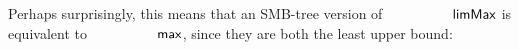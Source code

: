   Perhaps surprisingly, this means that an SMB-tree version of $\limMax$
  is equivalent to $\AgdaFunction{max}$, since they are both the least upper bound:
  \begin{code}%
\>[0]\<%
\\
\>[0]\AgdaSpace{}%
\AgdaSymbol{:}\AgdaSpace{}%
\AgdaSymbol{(}\AgdaSpace{}%
\AgdaSpace{}%
\AgdaSymbol{)}\AgdaSpace{}%
\AgdaSpace{}%
\<%
\\
\>[0]\AgdaSpace{}%
\AgdaSpace{}%
\AgdaSymbol{=}\AgdaSpace{}%
\AgdaSpace{}%
%
\>[17]\AgdaSpace{}%
\AgdaSpace{}%
\AgdaSpace{}%
\AgdaSpace{}%
\AgdaSymbol{(}\AgdaSpace{}%
\AgdaSpace{}%
\AgdaSymbol{))}\<%
\\
%
\\[\AgdaEmptyExtraSkip]%
\>[0]\AgdaSpace{}%
\AgdaSymbol{:}\AgdaSpace{}%
\AgdaSpace{}%
\AgdaSpace{}%
\AgdaSpace{}%
\AgdaSpace{}%
\<%
\\
\>[0]\AgdaSpace{}%
\AgdaSpace{}%
\AgdaSpace{}%
\AgdaSymbol{=}\AgdaSpace{}%
\AgdaSpace{}%
\AgdaSpace{}%
\AgdaSpace{}%
\AgdaSpace{}%
\AgdaSpace{}%
\AgdaSpace{}%
\AgdaSpace{}%
\AgdaSymbol{)}\<%
\\
%
\\[\AgdaEmptyExtraSkip]%
\>[0]\AgdaSpace{}%
\AgdaSymbol{:}\AgdaSpace{}%
\AgdaSpace{}%
\AgdaSymbol{\{}\AgdaSpace{}%
\AgdaSymbol{\}}\AgdaSpace{}%
\AgdaSpace{}%
\AgdaSpace{}%
\AgdaSpace{}%
\AgdaSpace{}%
\AgdaSpace{}%
\<%
\\
%
\\[\AgdaEmptyExtraSkip]%
\>[0]\AgdaSpace{}%
\AgdaSymbol{:}\AgdaSpace{}%
\AgdaSpace{}%
\AgdaSymbol{\{}\AgdaSpace{}%
\AgdaSymbol{\}}\AgdaSpace{}%
\AgdaSpace{}%
\AgdaSpace{}%
\AgdaSpace{}%
\AgdaSpace{}%
\AgdaSpace{}%
\<%
\\

\end{code}
